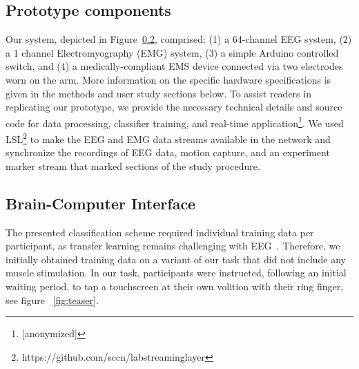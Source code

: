 \subsection{Prototype components}
Our system, depicted in Figure~\ref{}, comprised: (1) a 64-channel EEG system, (2) a 1 channel Electromyography (EMG) system, (3) a simple Arduino controlled switch, and (4) a medically-compliant EMS device connected via two electrodes worn on the arm. More information on the specific hardware specifications is given in the methods and user study sections below. To assist readers in replicating our prototype, we provide the necessary technical details and source code for data processing, classifier training, and real-time application\footnote{[anonymized]}. We used LSL\footnote{https://github.com/sccn/labstreaminglayer} to make the EEG and EMG data streams available in the network and synchronize the recordings of EEG data, motion capture, and an experiment marker stream that marked sections of the study procedure.


\subsection{Brain-Computer Interface}

The presented classification scheme required individual training data per participant, as transfer learning remains challenging with EEG~\cite{Wan2021-zz}. Therefore, we initially obtained training data on a variant of our task that did not include any muscle stimulation. In our task, participants were instructed, following an initial waiting period, to tap a touchscreen at their own volition with their ring finger, see figure ~\ref{fig:teaser}. 

